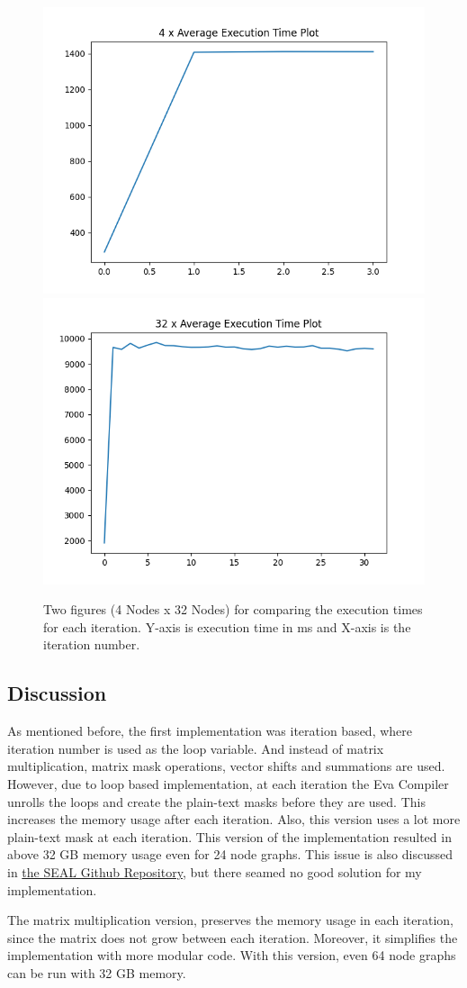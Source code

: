 \documentclass{winslabreport}
\begin{document}
\begin{figure}[H]
	\centering
	\includegraphics[width=.45\textwidth]{figure/4 x Average Execution Time.png}
	\includegraphics[width=.45\textwidth]{figure/32 x Average Execution Time.png}
	\caption{Two figures (4 Nodes x 32 Nodes) for comparing the execution times for each iteration. Y-axis is execution time in ms and X-axis is the iteration number.}
\end{figure}

\subsection{Discussion}
As mentioned before, the first implementation was iteration based, where iteration number is used as the loop variable. And instead of matrix multiplication, matrix mask operations, vector shifts and summations are used. However, due to loop based implementation, at each iteration the Eva Compiler unrolls the loops and create the plain-text masks before they are used. This increases the memory usage after each iteration. Also, this version uses a lot more plain-text mask at each iteration. This version of the implementation resulted in above 32 GB memory usage even for 24 node graphs. This issue is also discussed in \href{https://github.com/microsoft/SEAL/issues/365}{the SEAL Github Repository}, but there seamed no good solution for my implementation.   

The matrix multiplication version, preserves the memory usage in each iteration, since the matrix does not grow between each iteration. Moreover, it simplifies the implementation with more modular code. With this version, even 64 node graphs can be run with 32 GB memory. 
\end{document}
